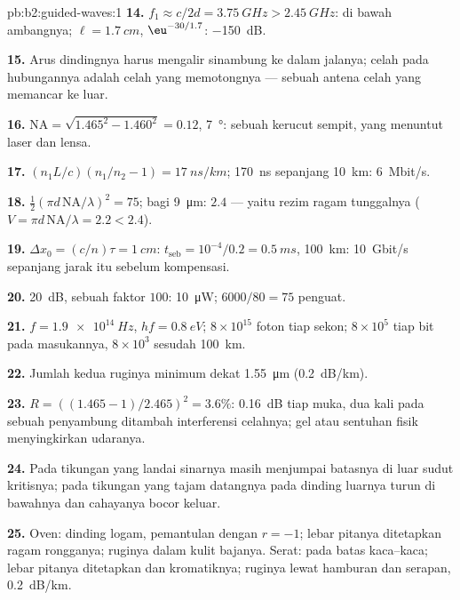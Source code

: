 \begin{solution}{pb:b2:guided-waves:1}
\textbf{14.} $f_1 \approx c/2d = \qty{3.75}{GHz} > \qty{2.45}{GHz}$: di bawah ambangnya; $\ell =
\qty{1.7}{cm}$, $\eu^{-30/1.7}$: \qty{-150}{dB}.

\textbf{15.} Arus dindingnya harus mengalir sinambung ke dalam jalanya;
celah pada hubungannya adalah celah yang memotongnya --- sebuah antena celah
yang memancar ke luar.

\textbf{16.} $\mathrm{NA} = \sqrt{1.465^2 - 1.460^2} = 0.12$, \qty{7}{\degree}: sebuah kerucut
sempit, yang menuntut laser dan lensa.

\textbf{17.} $(n_1L/c)(n_1/n_2 - 1) = \qty{17}{ns/km}$; \qty{170}{ns} sepanjang \qty{10}{km}:
\qty{6}{Mbit/s}.

\textbf{18.} $\tfrac12(\pi d\,\mathrm{NA}/\lambda)^2 = 75$; bagi \qty{9}{\micro m}: $2.4$ --- yaitu
rezim ragam tunggalnya ($V = \pi d\,\mathrm{NA}/\lambda = 2.2 < 2.4$).

\textbf{19.} $\Delta x_0 = (c/n)\tau = \qty{1}{cm}$: $t_{\text{seb}} = 10^{-4}/0.2 = \qty{0.5}{ms}$,
\qty{100}{km}: \qty{10}{Gbit/s} sepanjang jarak itu sebelum kompensasi.

\textbf{20.} \qty{20}{dB}, sebuah faktor $100$: \qty{10}{\micro W}; $6000/80 = 75$
penguat.

\textbf{21.} $f = \qty{1.9e14}{Hz}$, $hf = \qty{0.8}{eV}$; $8 \times 10^{15}$ foton tiap
sekon; $8 \times 10^5$ tiap bit pada masukannya, $8 \times 10^3$ sesudah \qty{100}{km}.

\textbf{22.} Jumlah kedua ruginya minimum dekat \qty{1.55}{\micro m}
(\qty{0.2}{dB/km}).

\textbf{23.} $R = ((1.465 - 1)/2.465)^2 = 3.6\%$: \qty{0.16}{dB} tiap muka, dua kali
pada sebuah penyambung ditambah interferensi celahnya; gel atau sentuhan fisik
menyingkirkan udaranya.

\textbf{24.} Pada tikungan yang landai sinarnya masih menjumpai batasnya di luar
sudut kritisnya; pada tikungan yang tajam datangnya pada dinding luarnya
turun di bawahnya dan cahayanya bocor keluar.

\textbf{25.} Oven: dinding logam, pemantulan dengan $r = -1$; lebar pitanya ditetapkan
ragam rongganya; ruginya dalam kulit bajanya. Serat:  pada batas kaca--kaca; lebar pitanya ditetapkan  dan
kromatiknya; ruginya lewat hamburan dan serapan, \qty{0.2}{dB/km}.
\end{solution}
